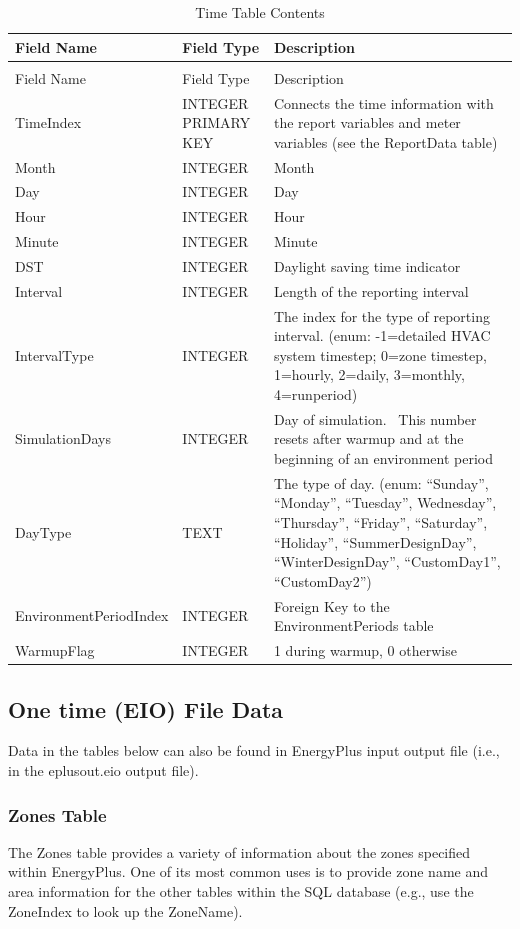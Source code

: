 \begin{longtable}[c]{>{\raggedright}p{1.5in}>{\raggedright}p{1.5in}>{\raggedright}p{3.0in}}
\caption{Time Table Contents \label{table:table-10.-time-table-contents}} \tabularnewline
\toprule
Field Name & Field Type & Description \tabularnewline
\midrule
\endfirsthead

\caption[]{Time Table Contents} \tabularnewline
\toprule
Field Name & Field Type & Description \tabularnewline
\midrule
\endhead

TimeIndex & INTEGER PRIMARY KEY & Connects the time information with the report variables and meter variables (see the ReportData table) \tabularnewline
Month & INTEGER & Month \tabularnewline
Day & INTEGER & Day \tabularnewline
Hour & INTEGER & Hour \tabularnewline
Minute & INTEGER & Minute \tabularnewline
DST & INTEGER & Daylight saving time indicator \tabularnewline
Interval & INTEGER & Length of the reporting interval \tabularnewline
IntervalType & INTEGER & The index for the type of reporting interval. (enum: -1=detailed HVAC system timestep; 0=zone timestep, 1=hourly, 2=daily, 3=monthly, 4=runperiod) \tabularnewline
SimulationDays & INTEGER & Day of simulation.~ This number resets after warmup and at the beginning of an environment period \tabularnewline
DayType & TEXT & The type of day. (enum: “Sunday”, “Monday”, “Tuesday”, Wednesday”, “Thursday”, “Friday”, “Saturday”, “Holiday”, “SummerDesignDay”, “WinterDesignDay”, “CustomDay1”, “CustomDay2”) \tabularnewline
Environment\-Period\-Index & INTEGER & Foreign Key to the EnvironmentPeriods table \tabularnewline
WarmupFlag & INTEGER & 1 during warmup, 0 otherwise \tabularnewline
\bottomrule
\end{longtable}

\subsection{One time (EIO) File Data}

Data in the tables below can also be found in EnergyPlus input output file (i.e., in the eplusout.eio output file).

\subsubsection{Zones Table}

The Zones table provides a variety of information about the zones specified within EnergyPlus. One of its most common uses is to provide zone name and area information for the other tables within the SQL database (e.g., use the ZoneIndex to look up the ZoneName).

